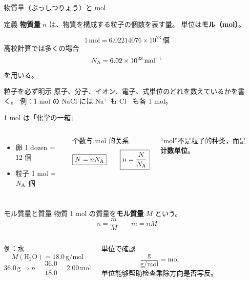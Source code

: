 \documentclass[notheorems,aspectratio=169]{beamer}
\newcommand{\jp}[1]{\textbf{\color{JapanBlue}#1}}
\newcommand{\key}[1]{\textbf{\color{ChinaRed}#1}}
\newcommand{\chem}[1]{\mathrm{#1}}
\newcommand{\unit}[1]{\,\mathrm{#1}}
\begin{document}
\begin{frame}{物質量（ぶっしつりょう）と mol}
  \begin{block}{定義}
    \jp{物質量} $n$ は、物質を構成する粒子の個数を表す量。
    単位は\jp{モル（mol）}。
  \end{block}

  \[
    \boxed{
      1\unit{mol}
      =6.02214076\times10^{23}\ \text{個}
    }
  \]
  高校計算では多くの場合
  \[
    N_{\rm A}=6.02\times10^{23}\unit{mol^{-1}}
  \]
  を用いる。

  \begin{alertblock}{粒子を必ず明示}
    原子、分子、イオン、電子、式単位のどれを数えているかを書く。
    例：1 mol の $\chem{NaCl}$ には Na$^+$ も Cl$^-$ も各 1 mol。
  \end{alertblock}
\end{frame}

\begin{frame}{1 mol は「化学の一箱」}
  \begin{columns}[c,onlytextwidth]
    \centering
    \begin{itemize}
      \item 卵 1 dozen = 12 個
      \item 粒子 1 mol = $N_{\rm A}$ 個
    \end{itemize}
    \begin{block}{个数与 mol 的关系}
      \[
        \boxed{N=nN_{\rm A}}
        \qquad
        \boxed{n=\frac{N}{N_{\rm A}}}
      \]
    \end{block}
    “mol”不是粒子的种类，而是\key{计数单位}。
  \end{columns}
\end{frame}

\begin{frame}{モル質量と質量}
  物質 1 mol の質量を\jp{モル質量} $M$ という。
  \[
    \boxed{n=\frac{m}{M}}
    \qquad
    \boxed{m=nM}
  \]

  \begin{columns}[T,onlytextwidth]
    \begin{block}{例：水}
      \[
        M(\chem{H_2O})=18.0\unit{g/mol}
      \]
      \[
        36.0\unit g
        \Rightarrow
        n=\frac{36.0}{18.0}=2.00\unit{mol}
      \]
    \end{block}
    \begin{alertblock}{単位で確認}
      \[
        \frac{\mathrm g}{\mathrm{g/mol}}
        =\mathrm{mol}
      \]
      单位能够帮助检查乘除方向是否写反。
    \end{alertblock}
  \end{columns}
\end{frame}
\end{document}
